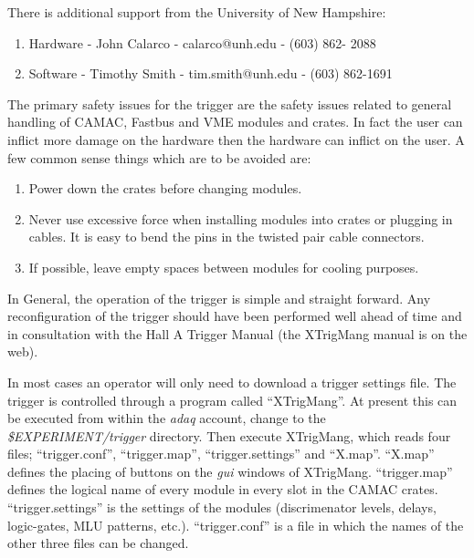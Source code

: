 \noindent There is additional support from the University of New Hampshire:

\begin{enumerate}

	\item Hardware - John Calarco - calarco@unh.edu - (603) 862- 2088

	\item Software - Timothy Smith - tim.smith@unh.edu - (603) 862-1691

\end{enumerate}



	The primary safety issues for the trigger are the safety issues related to general handling of CAMAC, Fastbus and VME modules and crates.  In fact the user can inflict more damage on the hardware then the hardware can inflict on the user.  A few common sense things which are to be avoided are:  

\begin{enumerate}

	\item Power down the crates before changing modules.

	\item Never use excessive force when installing modules into crates or plugging in cables. It is easy to bend the pins in the twisted pair cable connectors.

	\item If possible,  leave empty spaces between modules for cooling purposes. 

\end{enumerate}
	


	In General,  the operation of the trigger is simple and straight forward.  Any reconfiguration of the trigger should have been performed well ahead of time and in consultation with the Hall A Trigger Manual (the XTrigMang manual is on the web).
	
	In most cases an operator will only need to download a trigger settings file.  The trigger is controlled through a program called ``XTrigMang''.  At present this can be executed from within the
{\sl adaq} account, change to the {\sl \$EXPERIMENT/trigger} directory. Then execute XTrigMang, which reads four files;  ``trigger.conf'', ``trigger.map'', ``trigger.settings'' and ``X.map''.  ``X.map'' defines the placing of buttons on the {\sl gui} windows of XTrigMang.  ``trigger.map'' defines the logical name of every module in every slot in the CAMAC crates.  ``trigger.settings'' is the settings of the modules (discrimenator levels, delays, logic-gates, MLU patterns, etc.).  ``trigger.conf'' is a file in which the names of the other three files can be changed.

